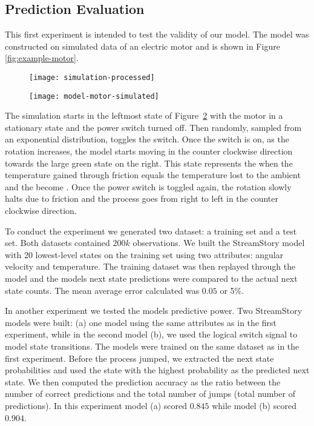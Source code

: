 \subsection{Prediction Evaluation}

This first experiment is intended to test the validity of our model. The model was constructed on simulated data of 
an electric motor and is shown in Figure \ref{fig:example-motor}. 
\begin{figure*}[]
  	\centering
  	\begin{subfigure}{.48\textwidth}
	  	\centering
	  	\texttt{[image: simulation-processed]}
  		\caption{\label{fig:simulation-chart}}
	\end{subfigure}
  	\begin{subfigure}{.48\textwidth}
	  	\centering
	  	\texttt{[image: model-motor-simulated]}
  		\caption{\label{fig:simulation-model}}
	\end{subfigure}
  	\caption{}
  	\label{fig:example-motor}
\end{figure*}
The simulation starts in the leftmost state of Figure~\ref{fig:simulation-model} with the motor in a stationary state
and the power switch turned off. Then  randomly, sampled from an exponential distribution,
toggles the switch. Once the switch is on, as the rotation increases, the model starts moving in the counter clockwise
direction towards the large green state on the right. This state represents the  when the temperature
gained through friction equals the temperature lost to the ambient and the  become .
Once the power switch is toggled again, the rotation slowly halts due to friction and the process goes from right to
left in the counter clockwise direction.

To conduct the experiment we generated two dataset: a training set and a test set. Both datasets
contained $200k$ observations. We built the StreamStory model with 20 lowest-level states on the training set using two attributes:
angular velocity and temperature. The training dataset was then replayed through the model and the
models next state predictions were compared to the actual next state counts. The mean average 
error calculated was $0.05$ or 5\%.

In another experiment we tested the models predictive power. Two StreamStory models were built: (a) one 
model using the same attributes as in the first experiment, while in the second model (b), we used
the logical switch signal to model state transitions. The models were trained on the same dataset
as in the first experiment. Before the process jumped, we extracted the next state probabilities
and used the state with the highest probability as the predicted next state. We then computed
the prediction accuracy as the ratio between the number of correct predictions and the total number
of jumps (total number of predictions). In this experiment model (a) scored $0.845$ while model
(b) scored $0.904$.


